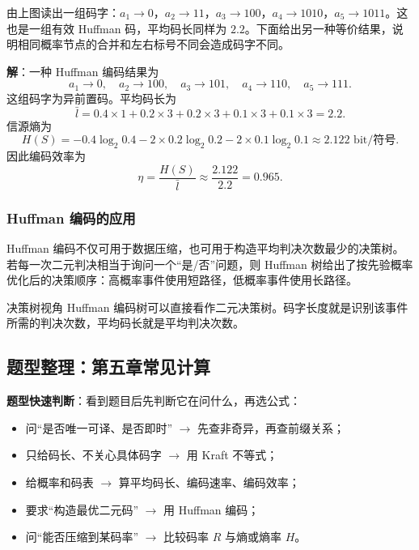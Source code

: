 \begin{example}
\begin{center}
\end{center}

由上图读出一组码字：$a_1\to0$，$a_2\to11$，$a_3\to100$，$a_4\to1010$，$a_5\to1011$。这也是一组有效 Huffman 码，平均码长同样为 $2.2$。下面给出另一种等价结果，说明相同概率节点的合并和左右标号不同会造成码字不同。

\textbf{解}：一种 Huffman 编码结果为
\[
a_1\to0,
\quad a_2\to100,
\quad a_3\to101,
\quad a_4\to110,
\quad a_5\to111.
\]
这组码字为异前置码。平均码长为
\[
\bar l=0.4\times1+0.2\times3+0.2\times3+0.1\times3+0.1\times3=2.2.
\]
信源熵为
\[
H(S)=-0.4\log_2 0.4-2\times0.2\log_2 0.2-2\times0.1\log_2 0.1
\approx2.122\text{ bit/符号}.
\]
因此编码效率为
\[
\eta=\frac{H(S)}{\bar l}\approx\frac{2.122}{2.2}=0.965.
\]
\end{example}

\subsubsection{Huffman 编码的应用}
Huffman 编码不仅可用于数据压缩，也可用于构造平均判决次数最少的决策树。若每一次二元判决相当于询问一个“是/否”问题，则 Huffman 树给出了按先验概率优化后的决策顺序：高概率事件使用短路径，低概率事件使用长路径。

\begin{keypoint}{决策树视角}
Huffman 编码树可以直接看作二元决策树。码字长度就是识别该事件所需的判决次数，平均码长就是平均判决次数。
\end{keypoint}

\subsection{题型整理：第五章常见计算}

\textbf{题型快速判断}：看到题目后先判断它在问什么，再选公式：
\begin{itemize}
  \item 问“是否唯一可译、是否即时” $\to$ 先查非奇异，再查前缀关系；
  \item 只给码长、不关心具体码字 $\to$ 用 Kraft 不等式；
  \item 给概率和码表 $\to$ 算平均码长、编码速率、编码效率；
  \item 要求“构造最优二元码” $\to$ 用 Huffman 编码；
  \item 问“能否压缩到某码率” $\to$ 比较码率 $R$ 与熵或熵率 $H$。
\end{itemize}

